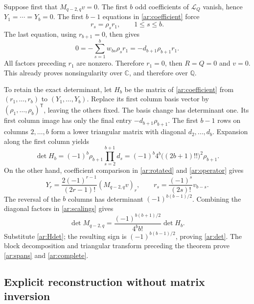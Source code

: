 Suppose first that $M_{q-2,q}v=0$. The first $b$ odd coefficients
of $\mathcal L_Q$ vanish, hence $Y_1=\cdots=Y_b=0$.
The first $b-1$ equations in \eqref{ar:coefficient} force
\[
                   r_s=\rho_sr_1,\qquad 1\le s\le b.
\]
The last equation, using $r_{b+1}=0$, then gives
\[
           0=-\sum_{s=1}^bw_{bs}\rho_sr_1
             =-d_{b+1}\rho_{b+1}r_1.
\]
All factors preceding $r_1$ are nonzero. Therefore $r_1=0$, then
$R=Q=0$ and $v=0$. This already proves nonsingularity over
$\mathbb C$, and therefore over $\mathbb Q$.

To retain the exact determinant, let $H_b$ be the matrix of
\eqref{ar:coefficient} from $(r_1,\ldots,r_b)$ to
$(Y_1,\ldots,Y_b)$. Replace its first column basis vector by
$(\rho_1,\ldots,\rho_b)^{\mathsf T}$, leaving the others fixed.
The basis change has determinant one. Its first column image has
only the final entry $-d_{b+1}\rho_{b+1}$. The first $b-1$ rows
on columns $2,\ldots,b$ form a lower triangular matrix with diagonal
$d_2,\ldots,d_b$. Expansion along the first column yields
\begin{equation}\label{ar:Hdet}
 \det H_b=(-1)^b\rho_{b+1}\prod_{s=2}^{b+1}d_s
    =(-1)^b4^b\bigl((2b+1)!!\bigr)^2\rho_{b+1}.
\end{equation}
On the other hand, coefficient comparison in \eqref{ar:rotated}
and \eqref{ar:operator} gives
\begin{equation}\label{ar:scalings}
 Y_r=\frac{2(-1)^{r-1}}{(2r-1)!}(M_{q-2,q}v)_r,
 \qquad r_s=\frac{(-1)^s}{(2s)!}v_{b-s}.
\end{equation}
The reversal of the $b$ columns has determinant
$(-1)^{b(b-1)/2}$. Combining the diagonal factors in
\eqref{ar:scalings} gives
\[
 \det M_{q-2,q}
     =\frac{(-1)^{b(b+1)/2}}{4^bb!}\det H_b.
\]
Substitute \eqref{ar:Hdet}; the resulting sign is
$(-1)^{b(b-1)/2}$, proving \eqref{ar:det}.
The block decomposition and triangular transform preceding the theorem
prove \eqref{ar:spans} and \eqref{ar:complete}.

\subsection{Explicit reconstruction without matrix inversion}

